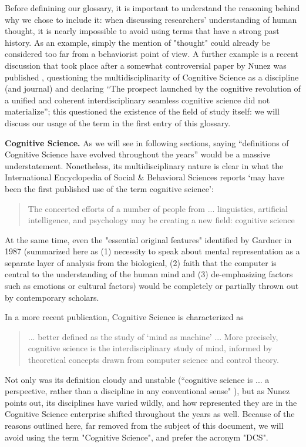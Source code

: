 \documentclass[../main.tex]{subfiles}
\begin{document}
Before definining our glossary, it is important to understand the reasoning behind why we chose to include it: when discussing researchers' understanding of human thought, it is nearly impossible to avoid using terms that have a strong past history. As an example, simply the mention of "thought" could already be considered too far from a behaviorist point of view. A further example is a recent discussion that took place after a somewhat controversial paper by Nunez was published \cite{nunezWhatHappenedCognitive2019}, questioning the multidisciplinarity of Cognitive Science as a discipline (and journal) and declaring \enquote{The prospect launched by the cognitive revolution of a unified and coherent interdisciplinary seamless cognitive science did not materialize}; this questioned the existence of the field of study itself: we will discuss our usage of the term in the first entry of this glossary.


\vspace{5pt}
\textbf{Cognitive Science.} As we will see in following sections, saying \enquote{definitions of Cognitive Science have evolved throughout the years} would be a massive understatement. Nonetheless, its multidisciplinary nature is clear in what the International Encyclopedia of Social \& Behavioral Sciences \cite{InternationalEncyclopediaSocial} reports \enquote*{may have been the first published use of the term cognitive science}:
\begin{quote}
    The concerted efforts of a number of people from ... linguistics, artificial intelligence, and psychology may be creating a new field: cognitive science
\end{quote}
At the same time, even the "essential original features" identified by Gardner in 1987 \cite{gardnerMindNewScience1987} (summarized here as (1) necessity to speak about mental representation as a separate layer of analysis from the biological, (2) faith that the computer is central to the understanding of the human mind and (3) de-emphasizing factors such as emotions or cultural factors) would be completely or partially thrown out by contemporary scholars.

In a more recent publication\cite{bodenMindMachineHistory2008}, Cognitive Science is characterized as
\begin{quote}
    ... better defined as the study of ‘mind as machine’ ... More precisely, cognitive science is the interdisciplinary study of mind, informed by theoretical concepts drawn from computer science and control theory.
\end{quote}
Not only was its definition cloudy and unstable (“cognitive science is ... a perspective, rather than a discipline in any conventional sense" \cite{sheehyCognitiveScience1995}), but as Nunez points out, its disciplines have varied wildly, and how represented they are in the Cognitive Science enterprise shifted throughout the years as well. Because of the reasons outlined here, far removed from the subject of this document, we will avoid using the term "Cognitive Science", and prefer the acronym "DCS".
\end{document}
